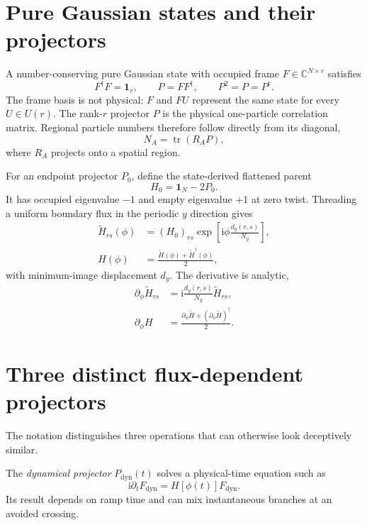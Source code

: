 \documentclass[aps,prb,twocolumn,floatfix,nofootinbib,superscriptaddress]{revtex4-2}
\newcommand{\tr}{\operatorname{tr}}
\newcommand{\ii}{\mathrm{i}}
\begin{document}
\section{Pure Gaussian states and their projectors}

A number-conserving pure Gaussian state with occupied frame
$F\in\mathbb{C}^{N\times r}$ satisfies
\begin{equation}
  F^\dagger F=\mathbf{1}_r,
  \qquad P=FF^\dagger,
  \qquad P^2=P=P^\dagger.
  \label{eq:frame-projector}
\end{equation}
The frame basis is not physical: $F$ and $FU$ represent the same state for
every $U\in U(r)$.  The rank-$r$ projector $P$ is the physical one-particle
correlation matrix.  Regional particle numbers therefore follow directly from
its diagonal,
\begin{equation}
  N_A=\tr(R_A P),
\end{equation}
where $R_A$ projects onto a spatial region.

For an endpoint projector $P_0$, define the state-derived flattened parent
\begin{equation}
  H_0=\mathbf{1}_N-2P_0.
  \label{eq:parent}
\end{equation}
It has occupied eigenvalue $-1$ and empty eigenvalue $+1$ at zero twist.
Threading a uniform boundary flux in the periodic $y$ direction gives
\begin{align}
  \widetilde H_{rs}(\phi)
    &=(H_0)_{rs}\exp\!\left[\ii\phi\frac{d_y(r,s)}{N_y}\right],\\
  H(\phi)&=\frac{\widetilde H(\phi)+\widetilde H^\dagger(\phi)}{2},
  \label{eq:twist}
\end{align}
with minimum-image displacement $d_y$.  The derivative is analytic,
\begin{align}
  \partial_\phi\widetilde H_{rs}
  &=\ii\frac{d_y(r,s)}{N_y}\widetilde H_{rs},\\
  \partial_\phi H
  &=\frac{\partial_\phi\widetilde H+
  (\partial_\phi\widetilde H)^\dagger}{2}.
  \label{eq:analytic-h-derivative}
\end{align}

\section{Three distinct flux-dependent projectors}

The notation distinguishes three operations that can otherwise look
deceptively similar.

The \emph{dynamical projector} $P_{\mathrm{dyn}}(t)$ solves a physical-time
equation such as
\begin{equation}
  \ii\partial_tF_{\mathrm{dyn}}=H[\phi(t)]F_{\mathrm{dyn}}.
\end{equation}
Its result depends on ramp time and can mix instantaneous branches at an
avoided crossing.
\end{document}
